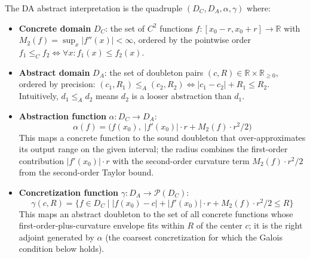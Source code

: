 \begin{definition}
\label{def:da_galois}
The DA abstract interpretation is the quadruple $(D_C, D_A, \alpha,
\gamma)$ where:

\begin{itemize}
    \item \textbf{Concrete domain} $D_C$: the set of $C^2$ functions
    $f: [x_0-r, x_0+r] \to \mathbb{R}$ with
    $M_2(f) = \sup_x |f''(x)| < \infty$, ordered by the pointwise
    order $f_1 \leq_C f_2 \iff \forall x: f_1(x) \leq f_2(x)$.

    \item \textbf{Abstract domain} $D_A$: the set of doubleton
    pairs $(c, R) \in \mathbb{R} \times \mathbb{R}_{\geq 0}$,
    ordered by precision: $(c_1, R_1) \leq_A (c_2, R_2) \iff
    |c_1 - c_2| + R_1 \leq R_2$. Intuitively, $d_1 \leq_A d_2$
    means $d_2$ is a looser abstraction than $d_1$.

    \item \textbf{Abstraction function} $\alpha: D_C \to D_A$:
    \begin{equation}
    \alpha(f) = \bigl(f(x_0),\; |f'(x_0)| \cdot r + M_2(f) \cdot r^2/2\bigr)
    \label{eq:alpha_da}
    \end{equation}
    This maps a concrete function to the sound doubleton that
    over-approximates its output range on the given interval; the
    radius combines the first-order contribution $|f'(x_0)| \cdot r$
    with the second-order curvature term $M_2(f) \cdot r^2/2$ from
    the second-order Taylor bound.

    \item \textbf{Concretization function} $\gamma: D_A \to
    \mathcal{P}(D_C)$:
    \begin{equation}
    \gamma(c, R) = \bigl\{f \in D_C \mid |f(x_0) - c| + |f'(x_0)| \cdot r
    + M_2(f) \cdot r^2/2 \leq R\bigr\}
    \label{eq:gamma_da}
    \end{equation}
    This maps an abstract doubleton to the set of all concrete
    functions whose first-order-plus-curvature envelope fits within
    $R$ of the center $c$; it is the right adjoint generated by
    $\alpha$ (the coarsest concretization for which the Galois
    condition below holds).
\end{itemize}
\end{definition}

